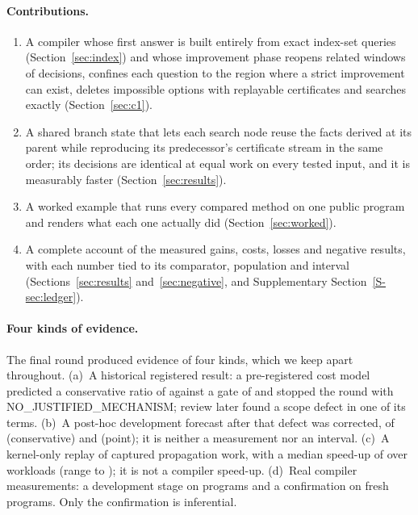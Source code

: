 \documentclass[11pt,a4paper]{article}
\begin{document}
\paragraph{Contributions.}
\begin{enumerate}
\item A compiler whose first answer is built entirely from exact index-set
queries (Section~\ref{sec:index}) and whose improvement phase reopens related
windows of decisions, confines each question to the region where a strict
improvement can exist, deletes impossible options with replayable certificates
and searches exactly (Section~\ref{sec:c1}).
\item A shared branch state that lets each search node reuse the facts derived at
its parent while reproducing its predecessor's certificate stream in the same
order; its decisions are identical at equal work on every tested input, and it is
measurably faster (Section~\ref{sec:results}).
\item A worked example that runs every compared method on one public program and
renders what each one actually did (Section~\ref{sec:worked}).
\item A complete account of the measured gains, costs, losses and negative
results, with each number tied to its comparator, population and interval
(Sections~\ref{sec:results} and~\ref{sec:negative}, and Supplementary
Section~\ref{S-sec:ledger}).
\end{enumerate}

\paragraph{Four kinds of evidence.}
The final round produced evidence of four kinds, which we keep apart
throughout. (a)~A historical registered result: a pre-registered cost model
predicted a conservative ratio of  against a gate of  and
stopped the round with NO\_JUSTIFIED\_MECHANISM; review later found a scope defect
in one of its terms. (b)~A post-hoc development forecast after that defect was
corrected, of  (conservative) and  (point); it is neither a
measurement nor an interval. (c)~A kernel-only replay of captured propagation
work, with a median speed-up of  over  workloads
(range  to ); it is not a compiler speed-up. (d)~Real
compiler measurements: a development stage on  programs and a
confirmation on  fresh programs. Only the confirmation is
inferential.
\end{document}
